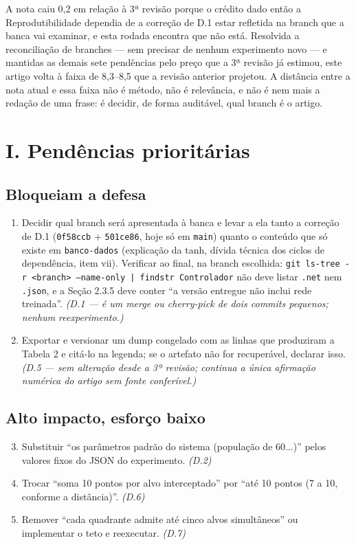 \documentclass[11pt,a4paper]{article}
\begin{document}
A nota caiu 0,2 em relação à 3ª revisão porque o crédito dado então a Reprodutibilidade dependia de a
correção de D.1 estar refletida na branch que a banca vai examinar, e esta rodada encontra que não
está. Resolvida a reconciliação de branches --- sem precisar de nenhum experimento novo --- e
mantidas as demais sete pendências pelo preço que a 3ª revisão já estimou, este artigo volta à faixa
de 8,3--8,5 que a revisão anterior projetou. A distância entre a nota atual e essa faixa não é
método, não é relevância, e não é nem mais a redação de uma frase: é decidir, de forma auditável, qual
branch é o artigo.

\section*{I. Pendências prioritárias}

\subsection*{Bloqueiam a defesa}

\begin{enumerate}
  \item Decidir qual branch será apresentada à banca e levar a ela tanto a correção de D.1
  (\texttt{0f58ccb} + \texttt{501ce86}, hoje só em \texttt{main}) quanto o conteúdo que só existe em
  \texttt{banco-dados} (explicação da tanh, dívida técnica dos ciclos de dependência, item vii).
  Verificar ao final, na branch escolhida: \texttt{git ls-tree -r <branch> --name-only | findstr
  Controlador} não deve listar \texttt{.net} nem \texttt{.json}, e a Seção 2.3.5 deve conter ``a
  versão entregue não inclui rede treinada''. \emph{(D.1 --- é um merge ou cherry-pick de dois
  commits pequenos; nenhum reexperimento.)}
  \item Exportar e versionar um dump congelado com as linhas que produziram a Tabela 2 e citá-lo na
  legenda; se o artefato não for recuperável, declarar isso. \emph{(D.5 --- sem alteração desde a 3ª
  revisão; continua a única afirmação numérica do artigo sem fonte conferível.)}
\end{enumerate}

\subsection*{Alto impacto, esforço baixo}

\begin{enumerate}\setcounter{enumi}{2}
  \item Substituir ``os parâmetros padrão do sistema (população de 60...)'' pelos valores fixos do
  JSON do experimento. \emph{(D.2)}
  \item Trocar ``soma 10 pontos por alvo interceptado'' por ``até 10 pontos (7 a 10, conforme a
  distância)''. \emph{(D.6)}
  \item Remover ``cada quadrante admite até cinco alvos simultâneos'' ou implementar o teto e
  reexecutar. \emph{(D.7)}
\end{enumerate}
\end{document}
